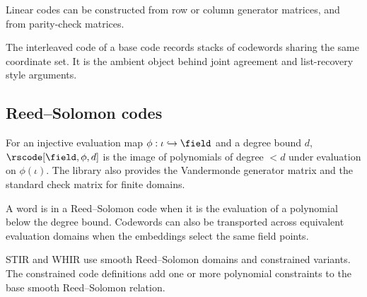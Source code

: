 \begin{definition}\label{def:generator_matrix}
    Linear codes can be constructed from row or column generator matrices, and from parity-check
    matrices.
\end{definition}

\begin{definition}\label{def:interleaved_code}
    The interleaved code of a base code records stacks of codewords sharing the same coordinate
    set. It is the ambient object behind joint agreement and list-recovery style arguments.
\end{definition}

\subsection{Reed--Solomon codes}\label{sec:reed_solomon_codes}

\begin{definition}\label{def:reed_solomon_code}
    For an injective evaluation map $\phi : \iota \hookrightarrow \field$ and a degree bound
    $d$, $\rscode[\field,\phi,d]$ is the image of polynomials of degree $<d$ under evaluation on
    $\phi(\iota)$. The library also provides the Vandermonde generator matrix and the standard
    check matrix for finite domains.
\end{definition}

\begin{lemma}\label{lem:rs_codeword_api}
    A word is in a Reed--Solomon code when it is the evaluation of a polynomial below the degree
    bound. Codewords can also be transported across equivalent evaluation domains when the
    embeddings select the same field points.
\end{lemma}

\begin{definition}\label{def:smooth_rs_code}
    STIR and WHIR use smooth Reed--Solomon domains and constrained variants. The constrained
    code definitions add one or more polynomial constraints to the base smooth Reed--Solomon
    relation.
\end{definition}

